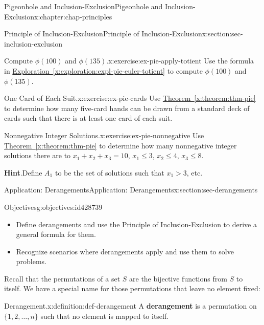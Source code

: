 \documentclass[oneside,10pt,]{book}
\newcommand{\blocktitlefont}{\relax}
\newcommand{\xreffont}{\relax}
\newcommand{\terminology}[1]{\textbf{#1}}
\numberwithin{equation}{section}
\newcommand{\gt}{>}
\begin{document}
\begin{chapterptx}{Pigeonhole and Inclusion-Exclusion}{}{Pigeonhole and Inclusion-Exclusion}{}{}{x:chapter:chap-principles}
\begin{sectionptx}{Principle of Inclusion-Exclusion}{}{Principle of Inclusion-Exclusion}{}{}{x:section:sec-inclusion-exclusion}
\begin{inlineexercise}{Compute \(\phi(100)\) and \(\phi(135)\).}{x:exercise:ex-pie-apply-totient}%
Use the formula in \hyperref[x:exploration:expl-pie-euler-totient]{Exploration~{\xreffont\ref{x:exploration:expl-pie-euler-totient}}} to compute \(\phi(100)\) and \(\phi(135)\).%
\end{inlineexercise}
\begin{inlineexercise}{One Card of Each Suit.}{x:exercise:ex-pie-cards}%
Use \hyperref[x:theorem:thm-pie]{Theorem~{\xreffont\ref{x:theorem:thm-pie}}} to determine how many five-card hands can be drawn from a standard deck of cards such that there is at least one card of each suit.%
\end{inlineexercise}
\begin{inlineexercise}{Nonnegative Integer Solutions.}{x:exercise:ex-pie-nonnegative}%
Use \hyperref[x:theorem:thm-pie]{Theorem~{\xreffont\ref{x:theorem:thm-pie}}} to determine how many nonnegative integer solutions there are to \(x_1 + x_2 + x_3 = 10\), \(x_1 \leq 3\), \(x_2 \leq 4\), \(x_3 \leq 8\).%
\par\smallskip%
\noindent\textbf{\blocktitlefont Hint}.\hypertarget{g:hint:id428460}{}\quad{}Define \(A_1\) to be the set of solutions such that \(x_1 \gt 3\), etc.%
\end{inlineexercise}
\end{sectionptx}
%
%
\typeout{************************************************}
\typeout{************************************************}
%
\begin{sectionptx}{Application: Derangements}{}{Application: Derangements}{}{}{x:section:sec-derangements}
\begin{objectives}{Objectives}{g:objectives:id428739}
%
\begin{itemize}[label=\textbullet]
\item{}Define derangements and use the Principle of Inclusion-Exclusion to derive a general formula for them.%
\item{}Recognize scenarios where derangements apply and use them to solve problems.%
\end{itemize}
\end{objectives}
Recall that the permutations of a set \(S\) are the bijective functions from \(S\) to itself. We have a special name for those permutations that leave no element fixed:%
\begin{definition}{Derangement.}{x:definition:def-derangement}%
A \terminology{derangement} is a permutation on \(\{1,2,\ldots,n\}\) such that no element is mapped to itself.%

\end{definition}
\end{sectionptx}
\end{chapterptx}
\end{document}
